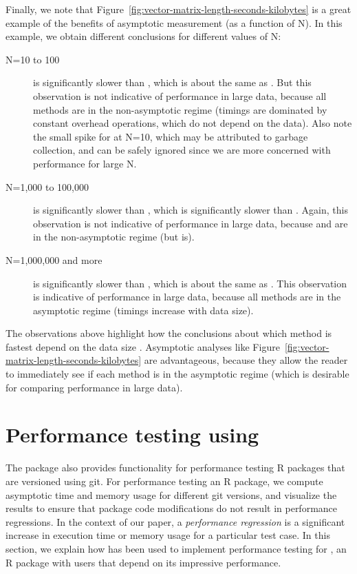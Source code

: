 Finally, we note that Figure~\ref{fig:vector-matrix-length-seconds-kilobytes} is a great example of the benefits of asymptotic measurement (as a function of N).
In this example, we obtain different conclusions for different values of N:
\begin{description}
    \item[N=10 to 100]  is significantly slower than , which is about the same as . 
    But this observation is not indicative of performance in large data, because all methods are in the non-asymptotic regime (timings are dominated by constant overhead operations, which do not depend on the data).
    Also note the small spike for  at N=10, which may be attributed to garbage collection, and can be safely ignored since we are more concerned with performance for large N.
    \item[N=1,000 to 100,000]  is significantly slower than , which is significantly slower than . 
    Again, this observation is not indicative of performance in large data, because  and  are in the non-asymptotic regime (but  is).
    \item[N=1,000,000 and more]  is significantly slower than , which is about the same as .
    This observation is indicative of performance in large data, because all methods are in the asymptotic regime (timings increase with data size).
\end{description}
The observations above highlight how the conclusions about which method is fastest depend on the data size . 
Asymptotic analyses like Figure~\ref{fig:vector-matrix-length-seconds-kilobytes} are advantageous, because they allow the reader to immediately see if each method is in the asymptotic regime (which is desirable for comparing performance in large data).

\section{Performance testing using }

The  package also provides functionality for performance testing R packages that are versioned using git. 
For performance testing an R package, we compute asymptotic time and memory usage for different git versions, and visualize the results to ensure that package code modifications do not result in performance regressions. 
In the context of our paper, a \textit{performance regression} is a significant increase in execution time or memory usage for a particular test case.
In this section, we explain how  has been used to implement performance testing for , an R package with users that depend on its impressive performance.

